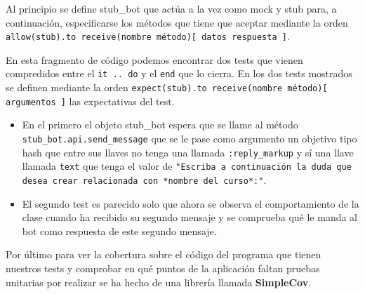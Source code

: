 Al principio se define stub\_bot que actúa a la vez como mock y stub para, a continuación, especificarse los métodos que tiene que aceptar mediante la orden \texttt{allow(stub).to receive(nombre método)[ datos respuesta ]}.
\par
En esta fragmento de código podemos encontrar dos tests que vienen compredidos entre el \texttt{it .. do} y el \texttt{end} que lo cierra. En los dos tests mostrados  se definen mediante la orden \texttt{expect(stub).to receive(nombre método)[  argumentos ]} las expectativas del test.
\begin{itemize}
 \item En el primero el objeto stub\_bot espera que se llame al método 
 \texttt{stub\_bot.api.send\_message} que se le pase como argumento un objetivo tipo hash que entre sus llaves no tenga una llamada \texttt{:reply\_markup} y sí una llave llamada \texttt{text} que tenga el valor de \texttt{"Escriba a continuación la duda que desea crear relacionada con *nombre del curso*:"}. 
 \item El segundo test es parecido solo que ahora se observa el comportamiento de la clase cuando ha recibido su segundo mensaje y se comprueba qué le manda al bot como respuesta de este segundo mensaje.
 \end{itemize}
 \par
 
 Por último para ver la cobertura sobre el código del programa que tienen nuestros tests y comprobar en qué puntos de la aplicación faltan pruebas unitarias por realizar se ha hecho de una librería llamada \textbf{SimpleCov}.
